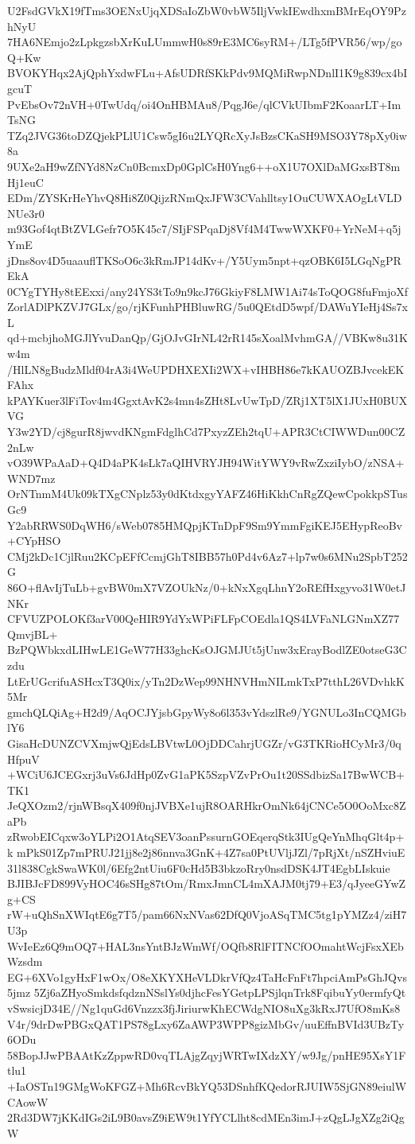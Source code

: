 U2FsdGVkX19fTms3OENxUjqXDSaIoZbW0vbW5IljVwkIEwdhxmBMrEqOY9PzhNyU
7HA6NEmjo2zLpkgzsbXrKuLUmmwH0s89rE3MC6syRM+/LTg5fPVR56/wp/goQ+Kw
BVOKYHqx2AjQphYxdwFLu+AfsUDRfSKkPdv9MQMiRwpNDnlI1K9g839cx4bIgcuT
PvEbsOv72nVH+0TwUdq/oi4OnHBMAu8/PqgJ6e/qlCVkUIbmF2KoaarLT+ImTsNG
TZq2JVG36toDZQjekPLlU1Csw5gI6u2LYQRcXyJsBzsCKaSH9MSO3Y78pXy0iw8a
9UXe2aH9wZfNYd8NzCn0BcmxDp0GplCsH0Yng6++oX1U7OXlDaMGxsBT8mHj1euC
EDm/ZYSKrHeYhvQ8Hi8Z0QijzRNmQxJFW3CVahlltsy1OuCUWXAOgLtVLDNUe3r0
m93Gof4qtBtZVLGefr7O5K45c7/SIjFSPqaDj8Vf4M4TwwWXKF0+YrNeM+q5jYmE
jDns8ov4D5uaauflTKSoO6c3kRmJP14dKv+/Y5Uym5npt+qzOBK6I5LGqNgPREkA
0CYgTYHy8tEExxi/any24YS3tTo9n9kcJ76GkiyF8LMW1Ai74sToQOG8fuFmjoXf
ZorlADlPKZVJ7GLx/go/rjKFunhPHBluwRG/5u0QEtdD5wpf/DAWuYIeHj4Ss7xL
qd+mcbjhoMGJlYvuDanQp/GjOJvGIrNL42rR145sXoalMvhmGA//VBKw8u31Kw4m
/HlLN8gBudzMldf04rA3i4WeUPDHXEXIi2WX+vIHBH86e7kKAUOZBJvcekEKFAhx
kPAYKuer3lFiTov4m4GgxtAvK2s4mn4sZHt8LvUwTpD/ZRj1XT5lX1JUxH0BUXVG
Y3w2YD/cj8gurR8jwvdKNgmFdglhCd7PxyzZEh2tqU+APR3CtCIWWDun00CZ2nLw
vO39WPaAaD+Q4D4aPK4sLk7aQIHVRYJH94WitYWY9vRwZxziIybO/zNSA+WND7mz
OrNTnmM4Uk09kTXgCNplz53y0dKtdxgyYAFZ46HiKkhCnRgZQewCpokkpSTusGc9
Y2abRRWS0DqWH6/sWeb0785HMQpjKTnDpF9Sm9YmmFgiKEJ5EHypReoBv+CYpHSO
CMj2kDc1CjlRuu2KCpEFfCcmjGhT8IBB57h0Pd4v6Az7+lp7w0s6MNu2SpbT252G
86O+flAvIjTuLb+gvBW0mX7VZOUkNz/0+kNxXgqLhnY2oREfHxgyvo31W0etJNKr
CFVUZPOLOKf3arV00QeHIR9YdYxWPiFLFpCOEdla1QS4LVFaNLGNmXZ77QmvjBL+
BzPQWbkxdLIHwLE1GeW77H33ghcKsOJGMJUt5jUnw3xErayBodlZE0otseG3Czdu
LtErUGcrifuASHcxT3Q0ix/yTn2DzWep99NHNVHmNILmkTxP7tthL26VDvhkK5Mr
gmchQLQiAg+H2d9/AqOCJYjsbGpyWy8o6l353vYdszlRe9/YGNULo3InCQMGblY6
GisaHcDUNZCVXmjwQjEdsLBVtwL0OjDDCahrjUGZr/vG3TKRioHCyMr3/0qHfpuV
+WCiU6JCEGxrj3uVs6JdHp0ZvG1aPK5SzpVZvPrOu1t20SSdbizSa17BwWCB+TK1
JeQXOzm2/rjnWBsqX409f0njJVBXe1ujR8OARHkrOmNk64jCNCe5O0OoMxc8ZaPb
zRwobEICqxw3oYLPi2O1AtqSEV3oanPssurnGOEqerqStk3IUgQeYnMhqGlt4p+k
mPkS01Zp7mPRUJ21jj8e2j86nnva3GnK+4Z7sa0PtUVljJZl/7pRjXt/nSZHviuE
31l838CgkSwaWK0l/6Efg2ntUiu6F0cHd5B3bkzoRry0nsdDSK4JT4EgbLIskuie
BJIBJcFD899VyHOC46sSHg87tOm/RmxJmnCL4mXAJM0tj79+E3/qJyeeGYwZg+CS
rW+uQhSnXWIqtE6g7T5/pam66NxNVas62DfQ0VjoASqTMC5tg1pYMZz4/ziH7U3p
WvIeEz6Q9mOQ7+HAL3nsYntBJzWmWf/OQfb8RlFITNCfOOmahtWcjFsxXEbWzsdm
EG+6XVo1gyHxF1wOx/O8eXKYXHeVLDkrVfQz4TaHcFnFt7hpciAmPsGhJQvs5jmz
5Zj6aZHyoSmkdsfqdznNSslYs0djhcFesYGetpLPSjlqnTrk8FqibuYy0ermfyQt
vSwsicjD34E//Ng1quGd6Vnzzx3fjJiriurwKhECWdgNIO8uXg3kRxJ7UfO8mKs8
V4r/9drDwPBGxQAT1PS78gLxy6ZaAWP3WPP8gizMbGv/uuEffnBVId3UBzTy6ODu
58BopJJwPBAAtKzZppwRD0vqTLAjgZqyjWRTwIXdzXY/w9Jg/pnHE95XsY1Ftlu1
+IaOSTn19GMgWoKFGZ+Mh6RcvBkYQ53DSnhfKQedorRJUIW5SjGN89eiulWCAowW
2Rd3DW7jKKdIGs2iL9B0avsZ9iEW9t1YfYCLlht8cdMEn3imJ+zQgLJgXZg2iQgW
